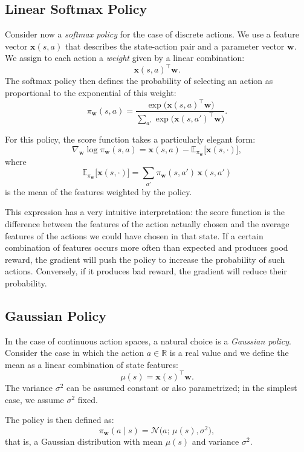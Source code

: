 \subsection{Linear Softmax Policy}

Consider now a \emph{softmax policy} for the case of discrete actions. We use a feature vector $\mathbf{x}(s,a)$ that describes the state-action pair and a parameter vector $\mathbf{w}$. We assign to each action a \emph{weight} given by a linear combination:
\[
\mathbf{x}(s,a)^\top \mathbf{w}.
\]
The softmax policy then defines the probability of selecting an action as proportional to the exponential of this weight:
\[
\pi_{\mathbf{w}}(s,a)
= \frac{\exp\big(\mathbf{x}(s,a)^\top \mathbf{w}\big)}
       {\sum_{a'} \exp\big(\mathbf{x}(s,a')^\top \mathbf{w}\big)}.
\]

For this policy, the score function takes a particularly elegant form:
\[
\nabla_{\mathbf{w}} \log \pi_{\mathbf{w}}(s,a)
= \mathbf{x}(s,a) - \mathbb{E}_{\pi_{\mathbf{w}}}\big[\mathbf{x}(s,\cdot)\big],
\]
where
\[
\mathbb{E}_{\pi_{\mathbf{w}}}\big[\mathbf{x}(s,\cdot)\big]
= \sum_{a'} \pi_{\mathbf{w}}(s,a')\, \mathbf{x}(s,a')
\]
is the mean of the features weighted by the policy.

This expression has a very intuitive interpretation: the score function is the difference between the features of the action actually chosen and the average features of the actions we could have chosen in that state. If a certain combination of features occurs more often than expected and produces good reward, the gradient will push the policy to increase the probability of such actions. Conversely, if it produces bad reward, the gradient will reduce their probability.

\subsection{Gaussian Policy}

In the case of continuous action spaces, a natural choice is a \emph{Gaussian policy}. Consider the case in which the action $a \in \mathbb{R}$ is a real value and we define the mean as a linear combination of state features:
\[
\mu(s) = \mathbf{x}(s)^\top \mathbf{w}.
\]
The variance $\sigma^2$ can be assumed constant or also parametrized; in the simplest case, we assume $\sigma^2$ fixed.

The policy is then defined as:
\[
\pi_{\mathbf{w}}(a \mid s) = \mathcal{N}\big(a;\, \mu(s), \sigma^2\big),
\]
that is, a Gaussian distribution with mean $\mu(s)$ and variance $\sigma^2$.

